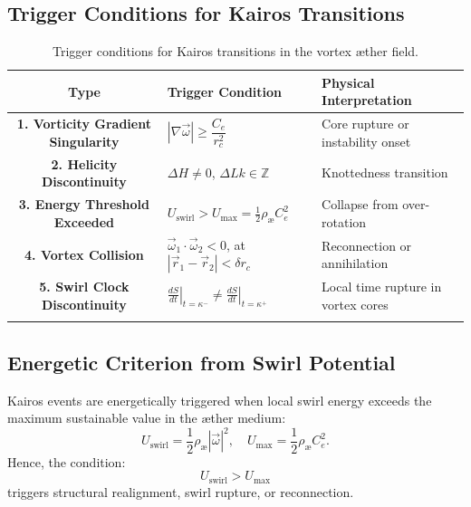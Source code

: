 \documentclass[a4paper,12pt]{article}
\begin{document}
    \subsection{Trigger Conditions for Kairos Transitions}
\begin{eqbox}
    \begin{table}[H]
        \centering
        \footnotesize
        \renewcommand{\arraystretch}{1.4}
        \begin{tabular}{|c|l|l|}
            \hline
            \textbf{Type} & \textbf{Trigger Condition} & \textbf{Physical Interpretation} \\
            \hline
            \textbf{1. Vorticity Gradient Singularity} &
            $|\nabla \vec{\omega}| \geq \dfrac{C_e}{r_c^2}$ &
            Core rupture or instability onset \\
            \textbf{2. Helicity Discontinuity} &
            $\Delta H \neq 0$, $\Delta Lk \in \mathbb{Z}$ &
            Knottedness transition \\
            \textbf{3. Energy Threshold Exceeded} &
            $U_{\text{swirl}} > U_{\text{max}} = \frac{1}{2} \rho_{\text{\ae}} C_e^2$ &
            Collapse from over-rotation \\
            \textbf{4. Vortex Collision} &
            $\vec{\omega}_1 \cdot \vec{\omega}_2 < 0$, at $|\vec{r}_1 - \vec{r}_2| < \delta r_c$ &
            Reconnection or annihilation \\
            \textbf{5. Swirl Clock Discontinuity} &
            $\left.\frac{dS}{dt}\right|_{t = \kappa^-} \neq \left.\frac{dS}{dt}\right|_{t = \kappa^+}$ &
            Local time rupture in vortex cores \\
            & & \\
            \hline
        \end{tabular}
        \caption{Trigger conditions for Kairos transitions in the vortex æther field.}\label{tab:table}
    \end{table}
\end{eqbox}

    \subsection{Energetic Criterion from Swirl Potential}
    Kairos events are energetically triggered when local swirl energy exceeds the maximum sustainable value in the æther medium:
    \begin{equation}
        U_{\text{swirl}} = \frac{1}{2} \rho_{\text{\ae}} |\vec{\omega}|^2,
        \quad
        U_{\text{max}} = \frac{1}{2} \rho_{\text{\ae}} C_e^2.
    \end{equation}
    Hence, the condition:
    \[
        U_{\text{swirl}} > U_{\text{max}}
    \]
    triggers structural realignment, swirl rupture, or reconnection.
\end{document}
